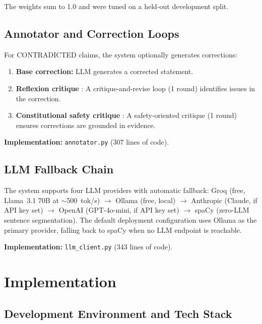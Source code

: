 \documentclass[12pt, a4paper, oneside]{report}
\begin{document}
The weights sum to 1.0 and were tuned on a held-out development split.

\section{Annotator and Correction Loops}

For CONTRADICTED claims, the system optionally generates corrections:
\begin{enumerate}[nosep]
    \item \textbf{Base correction:} LLM generates a corrected statement.
    \item \textbf{Reflexion critique} \cite{shinn2023reflexion}: A critique-and-revise loop (1 round) identifies issues in the correction.
    \item \textbf{Constitutional safety critique} \cite{bai2022constitutional}: A safety-oriented critique (1 round) ensures corrections are grounded in evidence.
\end{enumerate}

\textbf{Implementation:} \texttt{annotator.py} (307 lines of code).

\section{LLM Fallback Chain}

The system supports four LLM providers with automatic fallback: Groq (free, Llama~3.1 70B at $\sim$500~tok/s) $\rightarrow$ Ollama (free, local) $\rightarrow$ Anthropic (Claude, if API key set) $\rightarrow$ OpenAI (GPT-4o-mini, if API key set) $\rightarrow$ spaCy (zero-LLM sentence segmentation). The default deployment configuration uses Ollama as the primary provider, falling back to spaCy when no LLM endpoint is reachable.

\textbf{Implementation:} \texttt{llm\_client.py} (343 lines of code).

\chapter{Implementation}
\label{ch:implementation}

\section{Development Environment and Tech Stack}
\end{document}
